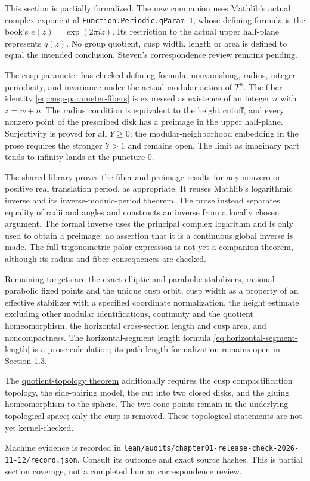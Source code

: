 This section is partially formalized. The new companion uses Mathlib's actual complex exponential \texttt{Function.Periodic.qParam 1}, whose defining formula is the book's $e(z)=\exp(2\pi iz)$. Its restriction to the actual upper half-plane represents $q(z)$. No group quotient, cusp width, length or area is defined to equal the intended conclusion. Steven's correspondence review remains pending.

The \hyperref[modular.cusp-parameter]{cusp parameter} has checked defining formula, nonvanishing, radius, integer periodicity, and invariance under the actual modular action of $T^n$. The fiber identity \eqref{eq:cusp-parameter-fibers} is expressed as existence of an integer $n$ with $z=w+n$. The radius condition is equivalent to the height cutoff, and every nonzero point of the prescribed disk has a preimage in the upper half-plane. Surjectivity is proved for all $Y\geq0$; the modular-neighborhood embedding in the prose requires the stronger $Y>1$ and remains open. The limit as imaginary part tends to infinity lands at the puncture $0$.

The shared library proves the fiber and preimage results for any nonzero or positive real translation period, as appropriate. It reuses Mathlib's logarithmic inverse and its inverse-modulo-period theorem. The prose instead separates equality of radii and angles and constructs an inverse from a locally chosen argument. The formal inverse uses the principal complex logarithm and is only used to obtain a preimage; no assertion that it is a continuous global inverse is made. The full trigonometric polar expression is not yet a companion theorem, although its radius and fiber consequences are checked.

Remaining targets are the exact elliptic and parabolic stabilizers, rational parabolic fixed points and the unique cusp orbit, cusp width as a property of an effective stabilizer with a specified coordinate normalization, the height estimate excluding other modular identifications, continuity and the quotient homeomorphism, the horizontal cross-section length and cusp area, and noncompactness. The horizontal-segment length formula \eqref{eq:horizontal-segment-length} is a prose calculation; its path-length formalization remains open in Section 1.3.

The \hyperref[modular.quotient-topology]{quotient-topology theorem} additionally requires the cusp compactification topology, the side-pairing model, the cut into two closed disks, and the gluing homeomorphism to the sphere. The two cone points remain in the underlying topological space; only the cusp is removed. These topological statements are not yet kernel-checked.

Machine evidence is recorded in \texttt{lean/audits/chapter01-release-check-2026-11-12/record.json}. Consult its outcome and exact source hashes. This is partial section coverage, not a completed human correspondence review.
